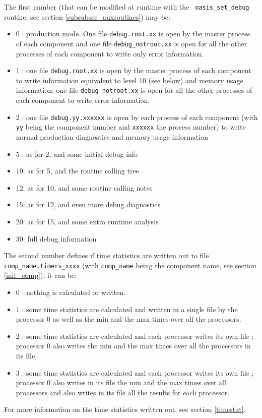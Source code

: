\begin{itemize}
  The first number (that can be modified at runtime with the {\tt
    oasis\_set\_debug} routine, see section
  \ref{subsubsec_auxroutines}) may be:
  \begin{itemize}
  \item 0 : production mode. One file {\tt debug.root.xx} is open by the master process of
    each component and one file {\tt debug\_notroot.xx} is open for all the
    other processes of each component to write only error information.
  \item 1 : one file {\tt debug.root.xx} is open by the master process of
    each component to write information equivalent to level 10 (see
    below) and memory usage information;
    one file {\tt debug\_notroot.xx} is open for all the other
    processes of each component to write error information.
  \item 2 : one file {\tt debug.yy.xxxxxx} is open by each process of each
    component (with {\tt yy} being the component number and {\tt xxxxxx} the process number)
    to write normal production diagnostics and memory usage information
  \item 5 : as for 2, and some initial debug info
  \item 10: as for 5, and the routine calling tree
  \item 12: as for 10, and some routine calling notes
  \item 15: as for 12, and even more debug diagnostics
  \item 20: as for 15, and some extra runtime analysis
  \item 30: full debug information
  \end{itemize}
  The second number defines if time statistics are written out to
  file {\tt comp\_name.timers\_xxxx} (with {\tt comp\_name} being the component name, see section \ref{init_comp}); it can be:
  \begin{itemize}
  \item 0 : nothing is calculated or written.
  \item 1 : some time statistics are calculated and written in a
    single file by the processor 0 as well as the min and the max
    times over all the processors.
  \item 2 : some time statistics are calculated and each processor
    writes its own file ; processor 0 also writes the min and the max
    times over all the processors in its file.
  \item 3 : some time statistics are calculated and each processor
    writes its own file ; processor 0 also writes in its file the min
    and the max times over all processors and also writes in its file
    all the results for each processor.
  \end{itemize}
 For more information on the time statistics written out, see section
  \ref{timestat}.


\end{itemize}
